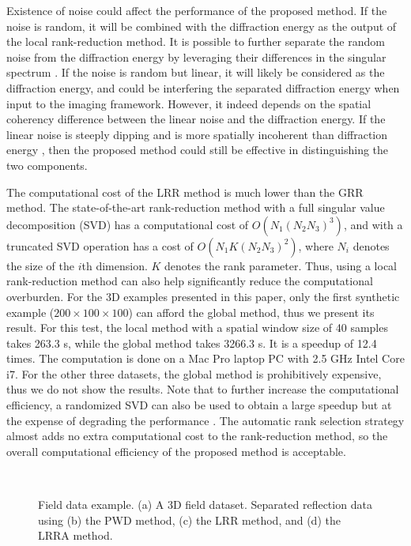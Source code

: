 \documentclass[10pt]{IEEEtran}
\DeclareRobustCommand{\new}[1]{#1}
\begin{document}
\new{Existence of noise could affect the performance of the proposed method. If the noise is random, it will be combined with the diffraction energy as the output of the local rank-reduction method. It is possible to further separate the random noise from the diffraction energy by leveraging their differences in the singular spectrum \cite{weilin2017dlsp,oboue2021geo1,oboue2021geo2}. If the noise is random but linear, it will likely be considered as the diffraction energy, and could be interfering the separated diffraction energy when input to the imaging framework. However, it indeed depends on the spatial coherency difference between the linear noise and the diffraction energy. If the linear noise is steeply dipping and is more spatially incoherent than diffraction energy \cite{weilin2017mmf}, then the proposed method could still be effective in distinguishing the two components. }

The computational cost of the LRR method is much lower than the GRR method. The state-of-the-art rank-reduction method with a full singular value decomposition (SVD) has a computational cost of $O(N_1(N_2N_3)^3)$, and with a truncated SVD operation has a cost of $O(N_1K(N_2N_3)^2)$, where $N_i$ denotes the size of the $i$th dimension. $K$ denotes the rank parameter.
Thus, using a local rank-reduction method can also help significantly reduce the computational overburden. For the 3D examples presented in this paper, only the first synthetic example ($200\times 100\times 100$) can afford the global method, thus we present its result. For this test, the local method with a spatial window size of 40 samples takes 263.3 s, while the global method takes 3266.3 s. It is a speedup of 12.4 times. The computation is done on a Mac Pro laptop PC with 2.5 GHz Intel Core i7. For the other three datasets, the global method is prohibitively expensive, thus we do not show the results. Note that to further increase the computational efficiency, a randomized SVD can also be used to obtain a large speedup but at the expense of degrading the performance \cite{li2014large}. The automatic rank selection strategy almost adds no extra computational cost to the rank-reduction method, so the overall computational efficiency of the proposed method is acceptable. 

\begin{figure}[htb!]
 \centering
     \\
\caption{Field data example. (a) A 3D field dataset. Separated reflection data using (b) the PWD method, (c) the LRR method, and (d) the LRRA method. }
\label{fig:b,b-pwd,b-lrr,b-lrra}
\end{figure}
\end{document}
